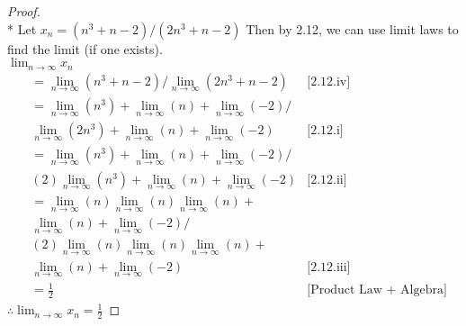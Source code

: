 \documentclass[a4paper]{article}
\begin{document}
\begin{flushleft}
        \begin{proof}\mbox{}\\*
            Let $x_n = (n^3 + n-2)/(2n^3 + n-2)$ Then by 2.12, we can use limit laws to find the limit (if one exists). \\
            $\lim_{n \to \infty} x_n$ \\
            \begin{align*}
                &= \lim_{n \to \infty} (n^3 + n-2)/ \lim_{n \to \infty}(2n^3 + n-2) &\text{[2.12.iv]}\\
                &= \lim_{n \to \infty} (n^3)+ \lim_{n \to \infty}(n) + \lim_{n \to \infty}(-2) / \\
                &      \lim_{n \to \infty}(2n^3) + \lim_{n \to \infty}(n) + \lim_{n \to \infty}(-2)   &\text{[2.12.i]} \\
                &= \lim_{n \to \infty} (n^3)+ \lim_{n \to \infty}(n) + \lim_{n \to \infty}(-2) / \\
                &      (2)\lim_{n \to \infty}(n^3) + \lim_{n \to \infty}(n) + \lim_{n \to \infty}(-2)   &\text{[2.12.ii]} \\
                &= \lim_{n \to \infty} (n)\lim_{n \to \infty} (n)\lim_{n \to \infty} (n)+ \\
                &      \lim_{n \to \infty}(n) + \lim_{n \to \infty}(-2) / \\
                &           (2)\lim_{n \to \infty}(n)\lim_{n \to \infty} (n)\lim_{n \to \infty} (n) +\\
                &                \lim_{n \to \infty}(n) + \lim_{n \to \infty}(-2)   &\text{[2.12.iii]} \\
                &= \frac{1}{2} &\text{[Product Law + Algebra]}
            \end{align*}
            $\therefore \lim_{n \to \infty} x_n = \frac{1}{2}$
        \end{proof}


    \end{flushleft}
\end{document}
